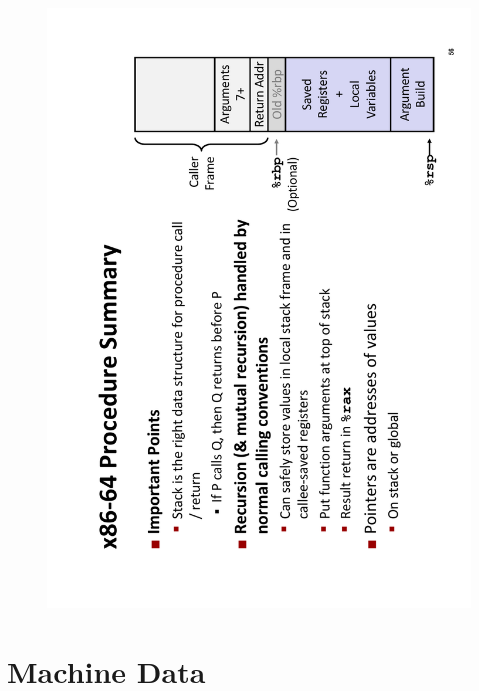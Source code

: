 \vspace{-20pt}
\begin{center}
\begin{figure}[h]
    \centering
    \includegraphics[width=0.8\linewidth]{machine-procedures.pdf}
\end{figure}
\end{center}
\vspace{-50pt}
\section{Machine Data}

